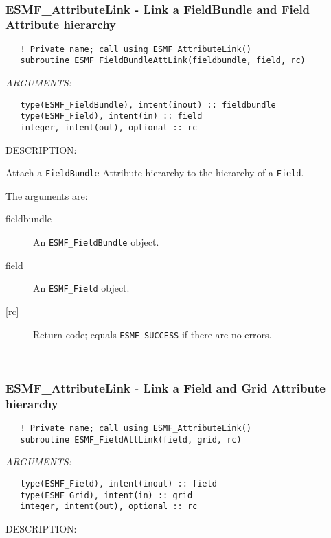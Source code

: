 \mbox{}\hrulefill\ 
 
\subsubsection [ESMF\_AttributeLink] {ESMF\_AttributeLink - Link a FieldBundle and Field Attribute hierarchy}


  
\begin{verbatim}   ! Private name; call using ESMF_AttributeLink()
   subroutine ESMF_FieldBundleAttLink(fieldbundle, field, rc)\end{verbatim}{\em ARGUMENTS:}
\begin{verbatim}   type(ESMF_FieldBundle), intent(inout) :: fieldbundle
   type(ESMF_Field), intent(in) :: field
   integer, intent(out), optional :: rc\end{verbatim}
{\sf DESCRIPTION:\\ }


   Attach a {\tt FieldBundle} Attribute hierarchy to the hierarchy of
   a {\tt Field}.
  
   The arguments are:
   \begin{description}
   \item [fieldbundle]
   An {\tt ESMF\_FieldBundle} object.
   \item [field]
   An {\tt ESMF\_Field} object.
   \item [{[rc]}]
   Return code; equals {\tt ESMF\_SUCCESS} if there are no errors.
   \end{description}
  
   
 
\mbox{}\hrulefill\ 
 
\subsubsection [ESMF\_AttributeLink] {ESMF\_AttributeLink - Link a Field and Grid Attribute hierarchy}


  
\begin{verbatim}   ! Private name; call using ESMF_AttributeLink()
   subroutine ESMF_FieldAttLink(field, grid, rc)\end{verbatim}{\em ARGUMENTS:}
\begin{verbatim}   type(ESMF_Field), intent(inout) :: field
   type(ESMF_Grid), intent(in) :: grid
   integer, intent(out), optional :: rc\end{verbatim}
{\sf DESCRIPTION:\\ }


